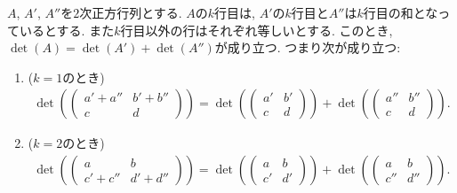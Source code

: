 \begin{theorem}
  \label{thm:multlin:row:add}
  $A$, $A'$, $A''$を$2$次正方行列とする.
  $A$の$k$行目は, $A'$の$k$行目と$A''$は$k$行目の和となっているとする.
  また$k$行目以外の行はそれぞれ等しいとする.
  このとき, $\det(A)=\det(A')+\det(A'')$が成り立つ.
  つまり次が成り立つ:
  \begin{enumerate}
    \item ($k=1$のとき)
      \begin{align*}
        \det(\begin{pmatrix}a'+a''&b'+b''\\c&d\end{pmatrix})=
          \det(\begin{pmatrix}a'&b'\\c&d\end{pmatrix})
            +
            \det(\begin{pmatrix}a''&b''\\c&d\end{pmatrix}).
      \end{align*}
    \item ($k=2$のとき)
      \begin{align*}
        \det(\begin{pmatrix}a&b\\c'+c''&d'+d''\end{pmatrix})=
        \det(\begin{pmatrix}a&b\\c'&d'\end{pmatrix})+
        \det(\begin{pmatrix}a&b\\c''&d''\end{pmatrix}).
      \end{align*}
  \end{enumerate}
\end{theorem}

